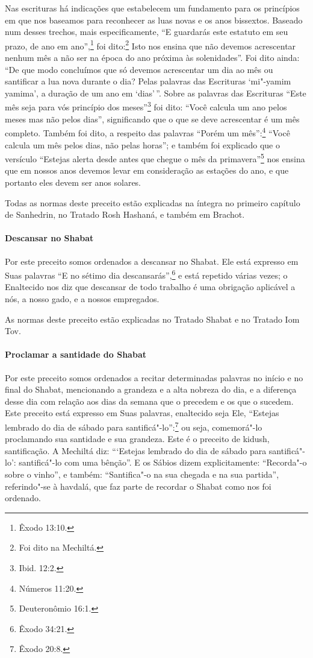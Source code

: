 \begin{multicols}{2}
Nas escrituras há indicações que estabelecem um fundamento para
os princípios em que nos baseamos para reconhecer as luas novas e os
anos bissextos. Baseado num desses trechos, mais especificamente, ``E
guardarás este estatuto em seu prazo, de ano em ano'',\footnote{Êxodo 13:10.} foi
dito:\footnote{Foi dito na Mechiltá\starr.} Isto nos
ensina que não devemos acrescentar nenhum mês a não ser na época do ano
próxima às solenidades''. Foi dito ainda: ``De que modo concluímos que
só devemos acrescentar um dia ao mês ou santificar a lua nova durante o dia?
Pelas palavras das Escrituras `mi"-yamim yamima', a duração de um ano em
`dias'\,''. Sobre as palavras das Escrituras ``Este mês seja para vós
princípio dos meses''\footnote{Ibid. 12:2.} foi dito: ``Você calcula um ano pelos
meses mas não pelos dias'', significando que o que se deve acrescentar é
um mês completo. Também foi dito, a respeito das palavras ``Porém um
mês'':\footnote{Números 11:20.} ``Você calcula um mês pelos dias, não pelas
horas''; e também foi explicado que o versículo ``Estejas alerta desde
antes que chegue o mês da primavera''\footnote{Deuteronômio 16:1.} nos ensina que
em nossos anos devemos levar em consideração as estações do ano, e que
portanto eles devem ser anos solares.

Todas as normas deste preceito estão explicadas na íntegra no primeiro
capítulo de Sanhedrin\starr, no Tratado Rosh Hashaná\starr, e também em Brachot\starr.

\paragraph{Descansar no Shabat}

Por este preceito somos ordenados a descansar no Shabat. Ele está
expresso em Suas palavras ``E no sétimo dia descansarás'',\footnote{Êxodo 34:21.}
e está repetido várias vezes; o Enaltecido nos diz que descansar de todo
trabalho é uma obrigação aplicável a nós, a nosso gado, e a nossos
empregados.

As normas deste preceito estão explicadas no Tratado Shabat e no Tratado
Iom Tov\starr.

\paragraph{Proclamar a santidade do Shabat}

Por este preceito somos ordenados a recitar determinadas palavras no
início e no final do Shabat, mencionando a grandeza e a alta nobreza do
dia, e a diferença desse dia com relação aos dias da semana que o
precedem e os que o sucedem. Este preceito está expresso em Suas
palavras, enaltecido seja Ele, ``Estejas lembrado do dia de sábado para
santificá"-lo'':\footnote{Êxodo 20:8.} ou seja, comemorá"-lo proclamando sua
santidade e sua grandeza. Este é o preceito de kidush\starr,
santificação. A Mechiltá\starr{} diz: ```Estejas lembrado do dia de sábado para
santificá"-lo': santificá"-lo com uma bênção''. E os Sábios dizem
explicitamente: ``Recorda"-o sobre o vinho'', e também: ``Santifica"-o na
sua chegada e na sua partida'', referindo"-se à havdalá\starr, que faz
parte de recordar o Shabat como nos foi ordenado.


\end{multicols}
